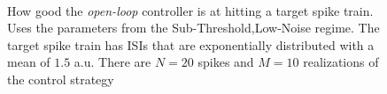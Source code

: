 \documentclass{article}
\begin{document}
\begin{figure}[htp]  
\begin{center}
\\
  \caption[ ]{How good the {\sl open-loop} controller is at hitting a target
  spike train. Uses the parameters from the Sub-Threshold,Low-Noise regime. The
  target spike train has ISIs that are exponentially distributed with a
  mean of $1.5$ a.u. There are $N=20$ spikes and $M=10$ realizations of the   
  control strategy}
  \label{fig:targettrain_ol_lownoise}
\end{center}
\end{figure}
\end{document}
